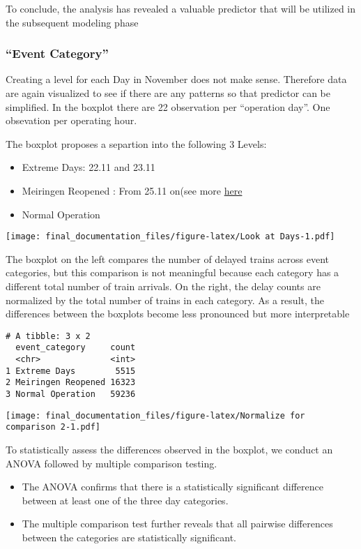 \documentclass[
]{article}
\providecommand{\tightlist}{%
  \setlength{\itemsep}{0pt}\setlength{\parskip}{0pt}}
\begin{document}
To conclude, the analysis has revealed a valuable predictor that will be
utilized in the subsequent modeling phase

\subsubsection{``Event Category''}\label{event-category}

Creating a level for each Day in November does not make sense. Therefore
data are again visualized to see if there are any patterns so that
predictor can be simplified. In the boxplot there are 22 observation per
``operation day''. One obsevation per operating hour.

The boxplot proposes a separtion into the following 3 Levels:

\begin{itemize}
\tightlist
\item
  Extreme Days: 22.11 and 23.11
\item
  Meiringen Reopened : From 25.11 on(see more
  \href{https://www.zentralbahn.ch/de/kennenlernen/die-zentralbahn/einblicke/wiedereroeffnung-der-strecke-meiringen-interlaken-ost-am-25-november-2024\%7D}{here}
\item
  Normal Operation
\end{itemize}

\texttt{[image: final\_documentation\_files/figure-latex/Look at Days-1.pdf]}

The boxplot on the left compares the number of delayed trains across
event categories, but this comparison is not meaningful because each
category has a different total number of train arrivals. On the right,
the delay counts are normalized by the total number of trains in each
category. As a result, the differences between the boxplots become less
pronounced but more interpretable

\begin{verbatim}
# A tibble: 3 x 2
  event_category     count
  <chr>              <int>
1 Extreme Days        5515
2 Meiringen Reopened 16323
3 Normal Operation   59236
\end{verbatim}

\texttt{[image: final\_documentation\_files/figure-latex/Normalize for comparison 2-1.pdf]}

To statistically assess the differences observed in the boxplot, we
conduct an ANOVA followed by multiple comparison testing.

\begin{itemize}
\item
  The ANOVA confirms that there is a statistically significant
  difference between at least one of the three day categories.
\item
  The multiple comparison test further reveals that all pairwise
  differences between the categories are statistically significant.
\end{itemize}
\end{document}
